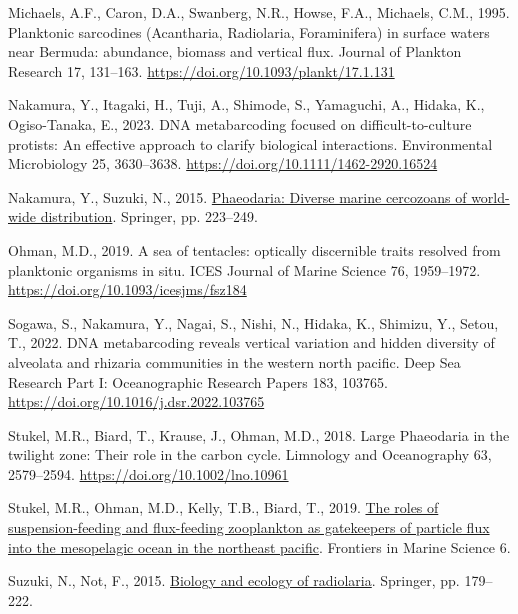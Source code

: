 \documentclass[
  letterpaper,
  DIV=11,
  numbers=noendperiod]{scrartcl}
\newlength{\cslhangindent}
\newlength{\cslentryspacingunit} %
\newenvironment{CSLReferences}[2] %
 {%
  \setlength{\parindent}{0pt}
  \ifodd #1
  \let\oldpar\par
  \def\par{\hangindent=\cslhangindent\oldpar}
  \fi
  \setlength{\parskip}{#2\cslentryspacingunit}
 }%
 {}
\begin{document}
\begin{CSLReferences}{1}{0}
\leavevmode{}%
Michaels, A.F., Caron, D.A., Swanberg, N.R., Howse, F.A., Michaels,
C.M., 1995. Planktonic sarcodines (Acantharia, Radiolaria, Foraminifera)
in surface waters near Bermuda: abundance, biomass and vertical flux.
Journal of Plankton Research 17, 131--163.
\url{https://doi.org/10.1093/plankt/17.1.131}

\leavevmode{}%
Nakamura, Y., Itagaki, H., Tuji, A., Shimode, S., Yamaguchi, A., Hidaka,
K., Ogiso-Tanaka, E., 2023. DNA metabarcoding focused on
difficult-to-culture protists: An effective approach to clarify
biological interactions. Environmental Microbiology 25, 3630--3638.
\url{https://doi.org/10.1111/1462-2920.16524}

\leavevmode{}%
Nakamura, Y., Suzuki, N., 2015.
\href{https://link.springer.com/chapter/10.1007/978-4-431-55130-0_9}{Phaeodaria:
Diverse marine cercozoans of world-wide distribution}. Springer, pp.
223--249.

\leavevmode{}%
Ohman, M.D., 2019. A sea of tentacles: optically discernible traits
resolved from planktonic organisms in situ. ICES Journal of Marine
Science 76, 1959--1972. \url{https://doi.org/10.1093/icesjms/fsz184}

\leavevmode{}%
Sogawa, S., Nakamura, Y., Nagai, S., Nishi, N., Hidaka, K., Shimizu, Y.,
Setou, T., 2022. DNA metabarcoding reveals vertical variation and hidden
diversity of alveolata and rhizaria communities in the western north
pacific. Deep Sea Research Part I: Oceanographic Research Papers 183,
103765. \url{https://doi.org/10.1016/j.dsr.2022.103765}

\leavevmode{}%
Stukel, M.R., Biard, T., Krause, J., Ohman, M.D., 2018. Large Phaeodaria
in the twilight zone: Their role in the carbon cycle. Limnology and
Oceanography 63, 2579--2594. \url{https://doi.org/10.1002/lno.10961}

\leavevmode{}%
Stukel, M.R., Ohman, M.D., Kelly, T.B., Biard, T., 2019.
\href{https://www.frontiersin.org/articles/10.3389/fmars.2019.00397}{The
roles of suspension-feeding and flux-feeding zooplankton as gatekeepers
of particle flux into the mesopelagic ocean in the northeast pacific}.
Frontiers in Marine Science 6.

\leavevmode{}%
Suzuki, N., Not, F., 2015.
\href{https://link.springer.com/chapter/10.1007/978-4-431-55130-0_8}{Biology
and ecology of radiolaria}. Springer, pp. 179--222.


\end{CSLReferences}
\end{document}
